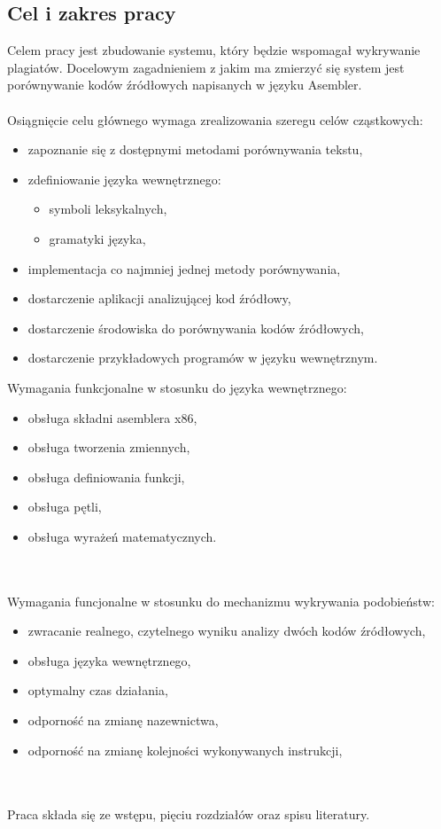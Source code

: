 \documentclass[a4paper,12pt,twoside]{article}
\begin{document}
\subsection{Cel i zakres pracy}

Celem pracy jest zbudowanie systemu, który będzie wspomagał wykrywanie plagiatów. Docelowym zagadnieniem z jakim ma zmierzyć się system jest porównywanie kodów źródłowych napisanych w języku Asembler.
\\ \\
Osiągnięcie celu głównego wymaga zrealizowania szeregu celów cząstkowych:
\begin{itemize}
\item zapoznanie się z dostępnymi metodami porównywania tekstu,
\item zdefiniowanie języka wewnętrznego:
\begin{itemize}
	\item symboli leksykalnych,
	\item gramatyki języka,
\end{itemize}
\item implementacja co najmniej jednej metody porównywania,
\item dostarczenie aplikacji analizującej kod źródłowy,
\item dostarczenie środowiska do porównywania kodów źródłowych,
\item dostarczenie przykładowych programów w języku wewnętrznym.
\end{itemize}
\pagebreak
Wymagania funkcjonalne w stosunku do języka wewnętrznego:
\begin{itemize}
\item obsługa składni asemblera x86,
\item obsługa tworzenia zmiennych,
\item obsługa definiowania funkcji,
\item obsługa pętli,
\item obsługa wyrażeń matematycznych.
\end{itemize}
\\ \\
Wymagania funcjonalne w stosunku do mechanizmu wykrywania podobieństw:
\begin{itemize}
\item zwracanie realnego, czytelnego wyniku analizy dwóch kodów źródłowych,
\item obsługa języka wewnętrznego,
\item optymalny czas działania,
\item odporność na zmianę nazewnictwa,
\item odporność na zmianę kolejności wykonywanych instrukcji,
\end{itemize}
\\ \\
Praca składa się ze wstępu, pięciu rozdziałów oraz spisu literatury.
\end{document}
